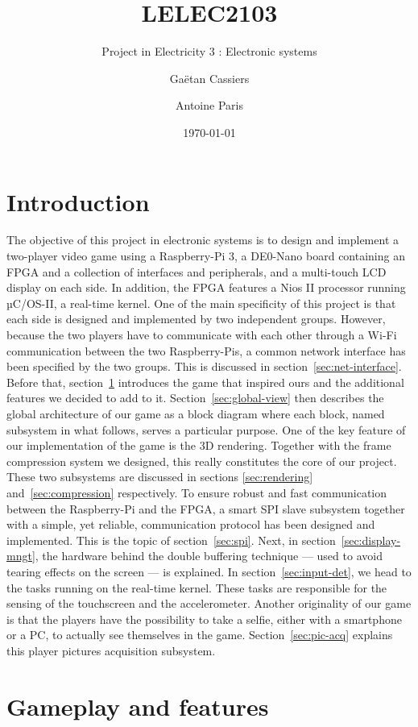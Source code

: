 \documentclass[english, DIV=13]{scrartcl}
\title{LELEC2103}
\subtitle{Project in Electricity 3 : Electronic systems}
\author{Gaëtan Cassiers\and Antoine Paris}
\date{\today}
\begin{document}
\maketitle

\section*{Introduction}
The objective of this project in electronic systems is to design and implement a
two-player video game using a Raspberry-Pi 3, a DE0-Nano board containing an FPGA
and a collection of interfaces and peripherals, and a multi-touch LCD display on
each side. In addition, the FPGA features a Nios II processor running µC/OS-II, a
real-time kernel.
One of the main specificity of this project is that each side is designed and
implemented by two independent groups. However, because the two players have to
communicate with
each other through a Wi-Fi communication between the two Raspberry-Pis, a common
network interface has been specified by the two groups. This is discussed
in section~\ref{sec:net-interface}. Before that, section~\ref{sec:gameplay-features}
introduces the game that inspired ours and the additional features we decided to
add to it. Section~\ref{sec:global-view} then describes the global architecture of
our game as a block diagram where each block, named subsystem in what follows, serves a
particular purpose. One of the key feature of our implementation of the game is the
3D rendering. Together with the frame compression system we designed, this really
constitutes the core of our project. These two subsystems are discussed in sections
\ref{sec:rendering} and~\ref{sec:compression} respectively.
To ensure robust and fast communication between the Raspberry-Pi and the FPGA, a smart
SPI slave subsystem together with a simple, yet reliable, communication protocol has
been designed and implemented. This is the topic of section~\ref{sec:spi}. Next, in
section~\ref{sec:display-mngt}, the hardware behind the double buffering technique
--- used to avoid tearing effects on the screen --- is explained.
In section~\ref{sec:input-det}, we head to the tasks running on the real-time kernel.
These tasks are responsible for the sensing of the touchscreen and the accelerometer.
Another originality of our game is that the players have the possibility to take a
selfie, either with a smartphone or a PC, to actually see themselves in the game.
Section~\ref{sec:pic-acq} explains this player pictures acquisition subsystem.

\section{Gameplay and features}
\label{sec:gameplay-features}
\end{document}
